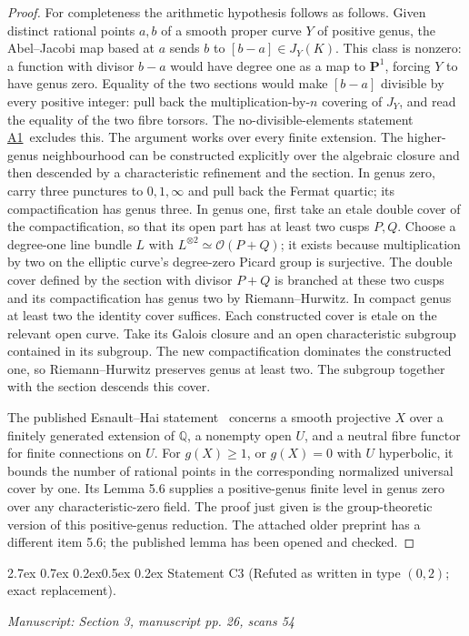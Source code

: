 \documentclass[11pt,a4paper]{article}
\makeatletter
\newcommand{\Q}{\mathbb Q}
\newcommand{\passage}[1]{\par\smallskip\noindent\textit{Manuscript: #1}\par\smallskip}
\newcommand{\resref}[1]{\hyperref[res:#1]{#1}}
\newcommand{\Arith}{\resref{A1}}
\renewcommand\paragraph{\@startsection{paragraph}{4}{\z@}%
  {2.7ex \@plus 0.7ex \@minus 0.2ex}{0.5ex \@plus 0.2ex}%
  {\normalfont\normalsize\bfseries}}
\makeatother
\begin{document}
\begin{proof}
For completeness the arithmetic hypothesis follows as follows. Given distinct rational points $a,b$ of a smooth proper curve $Y$ of positive genus, the Abel--Jacobi map based at $a$ sends $b$ to $[b-a]\in J_Y(K)$. This class is nonzero: a function with divisor $b-a$ would have degree one as a map to $\mathbf P^1$, forcing $Y$ to have genus zero. Equality of the two sections would make $[b-a]$ divisible by every positive integer: pull back the multiplication-by-$n$ covering of $J_Y$, and read the equality of the two fibre torsors. The no-divisible-elements statement \Arith\ excludes this. The argument works over every finite extension. The higher-genus neighbourhood can be constructed explicitly over the algebraic closure and then descended by a characteristic refinement and the section. In genus zero, carry three punctures to $0,1,\infty$ and pull back the Fermat quartic; its compactification has genus three. In genus one, first take an etale double cover of the compactification, so that its open part has at least two cusps $P,Q$. Choose a degree-one line bundle $L$ with $L^{\otimes2}\simeq\mathcal O(P+Q)$; it exists because multiplication by two on the elliptic curve's degree-zero Picard group is surjective. The double cover defined by the section with divisor $P+Q$ is branched at these two cusps and its compactification has genus two by Riemann--Hurwitz. In compact genus at least two the identity cover suffices. Each constructed cover is etale on the relevant open curve. Take its Galois closure and an open characteristic subgroup contained in its subgroup. The new compactification dominates the constructed one, so Riemann--Hurwitz preserves genus at least two. The subgroup together with the section descends this cover.

The published Esnault--Hai statement~\cite[Theorem 5.5]{EsnaultHai2008} concerns a smooth projective $X$ over a finitely generated extension of $\Q$, a nonempty open $U$, and a neutral fibre functor for finite connections on $U$. For $g(X)\ge1$, or $g(X)=0$ with $U$ hyperbolic, it bounds the number of rational points in the corresponding normalized universal cover by one. Its Lemma 5.6 supplies a positive-genus finite level in genus zero over any characteristic-zero field. The proof just given is the group-theoretic version of this positive-genus reduction. The attached older preprint has a different item 5.6; the published lemma has been opened and checked.
\end{proof}

\paragraph{Statement C3 (Refuted as written in type $(0,2)$; exact replacement).}\label{res:C3}
\passage{Section 3, manuscript pp. 26, scans 54}
\end{document}

